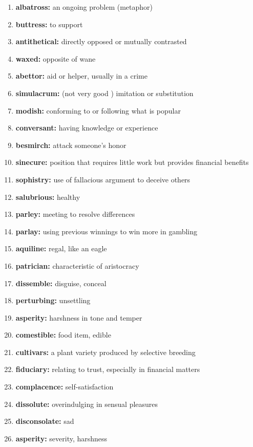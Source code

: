 \documentclass{article}
\begin{document}
\begin{enumerate}
    \item \textbf{albatross: }{an ongoing problem (metaphor)}
    \item \textbf{buttress: }{to support}
    \item \textbf{antithetical: }{directly opposed or mutually contrasted}
    \item \textbf{waxed: }{opposite of wane}
    \item \textbf{abettor: }{aid or helper, usually in a crime}
    \item \textbf{simulacrum: }{(not very good ) imitation or substitution}
    \item \textbf{modish: }{conforming to or following what is popular}
    \item \textbf{conversant: }{having knowledge or experience}
    \item \textbf{besmirch: }{attack someone's honor}
    \item \textbf{sinecure: }{position that requires little work but provides financial benefits}
    \item \textbf{sophistry: }{use of fallacious argument to deceive others}
    \item \textbf{salubrious: }{healthy}
    \item \textbf{parley: }{meeting to resolve differences}
    \item \textbf{parlay: }{using previous winnings to win more in gambling}
    \item \textbf{aquiline: }{regal, like an eagle}
    \item \textbf{patrician: }{characteristic of aristocracy}
    \item \textbf{dissemble: }{disguise, conceal}
    \item \textbf{perturbing: }{unsettling}
    \item \textbf{asperity: }{harshness in tone and temper}
    \item \textbf{comestible: }{food item, edible}
    \item \textbf{cultivars: }{a plant variety produced by selective breeding}
    \item \textbf{fiduciary: }{relating to trust, especially in financial matters}
    \item \textbf{complacence: }{self-satisfaction}
    \item \textbf{dissolute: }{overindulging in sensual pleasures}
    \item \textbf{disconsolate: }{sad}
    \item \textbf{asperity: }{severity, harshness}

\end{enumerate}
\end{document}
